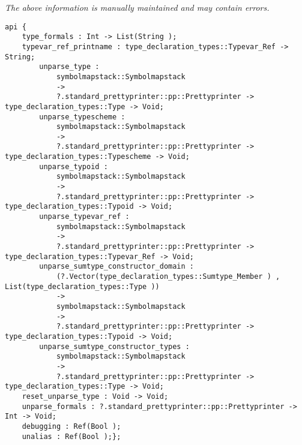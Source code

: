 \label{api:Unparse\_Type}

{\tiny \it The above information is manually maintained and may contain errors.}
\begin{verbatim}
api {
    type_formals : Int -> List(String );
    typevar_ref_printname : type_declaration_types::Typevar_Ref -> String;
        unparse_type :
            symbolmapstack::Symbolmapstack
            ->
            ?.standard_prettyprinter::pp::Prettyprinter -> type_declaration_types::Type -> Void;
        unparse_typescheme :
            symbolmapstack::Symbolmapstack
            ->
            ?.standard_prettyprinter::pp::Prettyprinter -> type_declaration_types::Typescheme -> Void;
        unparse_typoid :
            symbolmapstack::Symbolmapstack
            ->
            ?.standard_prettyprinter::pp::Prettyprinter -> type_declaration_types::Typoid -> Void;
        unparse_typevar_ref :
            symbolmapstack::Symbolmapstack
            ->
            ?.standard_prettyprinter::pp::Prettyprinter -> type_declaration_types::Typevar_Ref -> Void;
        unparse_sumtype_constructor_domain :
            (?.Vector(type_declaration_types::Sumtype_Member ) , List(type_declaration_types::Type ))
            ->
            symbolmapstack::Symbolmapstack
            ->
            ?.standard_prettyprinter::pp::Prettyprinter -> type_declaration_types::Typoid -> Void;
        unparse_sumtype_constructor_types :
            symbolmapstack::Symbolmapstack
            ->
            ?.standard_prettyprinter::pp::Prettyprinter -> type_declaration_types::Type -> Void;
    reset_unparse_type : Void -> Void;
    unparse_formals : ?.standard_prettyprinter::pp::Prettyprinter -> Int -> Void;
    debugging : Ref(Bool );
    unalias : Ref(Bool );};
\end{verbatim}
